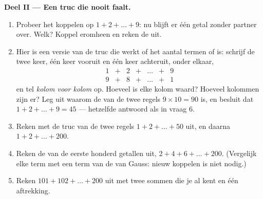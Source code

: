 \begin{problem}
\medskip
\noindent\textbf{Deel II --- Een truc die nooit faalt.}
\begin{enumerate}[resume]
  \item Probeer het koppelen op $1 + 2 + \dots + 9$: nu blijft er één getal
        zonder partner over. Welk? Koppel eromheen en reken de  uit.
  \item Hier is een versie van de truc die werkt of het aantal termen  of
         is: schrijf de  twee keer, één keer vooruit en één keer
        achteruit, onder elkaar,
        \[
        \begin{array}{ccccccc}
        1 & + & 2 & + & \dots & + & 9 \\
        9 & + & 8 & + & \dots & + & 1
        \end{array}
        \]
        en tel \emph{kolom voor kolom} op. Hoeveel is elke kolom waard?
        Hoeveel kolommen zijn er? Leg uit waarom de  van de twee regels
        $9 \times 10 = 90$ is, en besluit dat $1 + 2 + \dots + 9 = 45$ ---
        hetzelfde antwoord als in vraag 6.
  \item Reken met de truc van de twee regels $1 + 2 + \dots + 50$ uit, en
        daarna $1 + 2 + \dots + 200$.
  \item Reken de  van de eerste honderd \emph{} getallen uit,
        $2 + 4 + 6 + \dots + 200$. (Vergelijk elke term met een term van de
         van Gauss: nieuw koppelen is niet nodig.)
  \item Reken $101 + 102 + \dots + 200$ uit met twee sommen die je al kent en
        één aftrekking.
\end{enumerate}


\end{problem}
